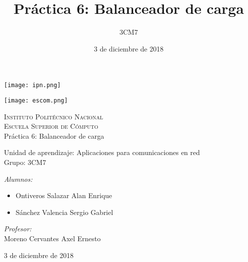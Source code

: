 \documentclass[15pt]{article}
\title{Práctica 6: Balanceador de carga}
\author{3CM7}
\date{3 de diciembre de 2018}
\begin{document}
	
	\begin{titlepage}
		\begin{center}
			
			
			\noindent
			\begin{minipage}{0.5\textwidth}
				\begin{flushleft} \large
					\texttt{[image: ipn.png]}
				\end{flushleft}
			\end{minipage}%
			\begin{minipage}{0.55\textwidth}
				\begin{flushright} \large
					\texttt{[image: escom.png]}
				\end{flushright}
			\end{minipage}
			
			\textsc{\LARGE Instituto Politécnico Nacional}\\[0.5cm]
			
			\textsc{\Large Escuela Superior de Cómputo}\\[1cm]
			
			
			{ \huge Práctica 6: Balanceador de carga \\[1cm] }
			
			{ \Large Unidad de aprendizaje: Aplicaciones para comunicaciones en red} \\[1cm]
			
			{ \Large Grupo: 3CM7 } \\[1cm]
			
			\noindent
			\begin{minipage}{0.5\textwidth}
				\begin{flushleft} \large
					\emph{Alumnos:}\\
					\begin{itemize}\setlength\itemsep{0em}
						\item Ontiveros Salazar Alan Enrique
						\item Sánchez Valencia Sergio Gabriel
					\end{itemize}
				\end{flushleft}
			\end{minipage}%
			\begin{minipage}{0.5\textwidth}
				\begin{flushright} \large
					\emph{Profesor:} \\
					Moreno Cervantes Axel Ernesto
				\end{flushright}
			\end{minipage}
			
			\vfill
			
			{\large 3 de diciembre de 2018}
		\end{center}
	\end{titlepage}
\end{document}

